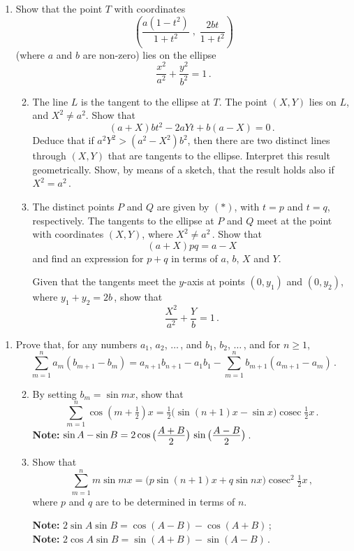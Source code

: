 \documentclass[a4, 11pt]{report}
\newlength{\qspace}
\newcounter{qnumber}
\newenvironment{question}%
 {\vspace{\qspace}
  \begin{enumerate}[\bfseries 1\quad][10]%
    \setcounter{enumi}{\value{qnumber}}%
    \item%
 }
{
  \end{enumerate}
  \filbreak
  \stepcounter{qnumber}
 }
\newenvironment{questionparts}[1][1]%
 {
  \begin{enumerate}[\bfseries (i)]%
    \setcounter{enumii}{#1}
    \addtocounter{enumii}{-1}
    \setlength{\itemsep}{5mm}
    \setlength{\parskip}{3pt}
 }
 {
  \end{enumerate}
 }
\DeclareMathOperator{\cosec}{cosec}
\def\ge{\geqslant}
\begin{document}
\begin{question}
Show that the point $T$ with coordinates
\[
\left( \frac{a(1-t^2)}{1+t^2} \; , \; \frac{2bt}{1+t^2}\right)
\tag{$*$}
\]
(where $a$ and $b$ are non-zero) lies on the ellipse
\[
\frac{x^2}{a^2} + \frac{y^2}{b^2} =1
\,.
\]
\begin{questionparts}
\item
The line $L$ is the  
tangent to the ellipse at $T$.
The point $(X,Y)$ lies on $L$,
 and $X^2\ne a^2$. Show that
\[
(a+X)bt^2 -2aYt +b(a-X) =0
\,.
\]
Deduce that
if $a^2Y^2>(a^2-X^2)b^2$, then
there are
 two distinct
lines through $(X,Y)$ that are tangents to the ellipse. Interpret
this
result geometrically. Show, by means of a sketch,
that the result  holds also  if $X^2=a^2\,$.

\item
The distinct points  $P$ and $Q$ are given by 
$(*)$, with $t=p$ and $t=q$,
respectively.
The tangents to the ellipse at 
$P$
and 
$Q$
meet at the point   with coordinates $(X,Y)$, where $X^2\ne a^2\,$.
Show that \[
(a+X)pq = a-X\]
 and find an expression for $p+q$ in terms
of $a$, $b$, $X$ and $Y$.



Given that the tangents meet the $y$-axis
at points $(0,y_1)$ and $(0,y_2)$, where $y_1+y_2 = 2b\,$, show that
\[
\frac{X^2}{a^2} +\frac{Y}{b}= 1  
\,.
\]
\end{questionparts}
\end{question}
\begin{question}

Prove that, for any numbers $a_1$, $a_2$, $\ldots$\,,
and $b_1$, $b_2$, $\ldots$\,, and for $n\ge1$,
\[
\sum_{m=1}^n a_m(b_{m+1} -b_m) = a_{n+1}b_{n+1} -a_1b_1
-\sum_{m=1}^n b_{m+1}(a_{m+1} -a_m)
\,.
\]

\begin{questionparts}
\item
By setting $b_m = \sin mx$, show that
\[
\sum_{m=1}^n \cos (m+\tfrac12)x 
= \tfrac12 
\big(\sin (n+1)x - \sin x \big)
\cosec \tfrac12 x
\,.
\]
{\bf Note:} 
$\sin A - \sin B = 
\displaystyle 
2 
\cos \big( \tfrac{{\displaystyle A+B\vphantom{_1}}}
{\displaystyle 2\vphantom{^1}} \big)\,
\sin\big( \tfrac{{\displaystyle A-B\vphantom{_1}}}{\displaystyle 2\vphantom{^1}} \big)\,
$.

\item
Show that
\[
\sum_{m=1}^n m\sin mx 
= 
\big (p \sin(n+1)x +q \sin nx\big)
\cosec^2 \tfrac12 x 
\,,
\]
where $p$ and $q$ are to be determined in terms of $n$.

\vspace{3mm}
{\bf Note:} 
$2\sin A \sin B =  \cos (A-B) - \cos (A+B)\,$;
\\[2mm] 
\phantom
{\bf Note:} 
$2\cos A \sin B =  \sin (A+B) - \sin (A-B)\,$.

\end{questionparts}
\end{question}
\end{document}
